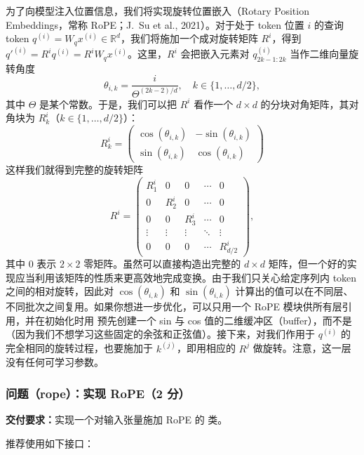 为了向模型注入位置信息，我们将实现旋转位置嵌入（Rotary Position Embeddings，常称 RoPE；J.~Su et al., 2021）。对于处于 token 位置 $i$ 的查询 token $q^{(i)} = W_q x^{(i)} \in \mathbb{R}^d$，我们将施加一个成对旋转矩阵 $R^i$，得到 $q'^{(i)} = R^i q^{(i)} = R^i W_q x^{(i)}$。这里，$R^i$ 会把嵌入元素对 $q^{(i)}_{2k-1:2k}$ 当作二维向量旋转角度
\[
\theta_{i,k} = \frac{i}{\Theta^{(2k-2)/d}}, \quad k \in \{1, \ldots, d/2\},
\]
其中 $\Theta$ 是某个常数。于是，我们可以把 $R^i$ 看作一个 $d \times d$ 的分块对角矩阵，其对角块为 $R^i_k$（$k \in \{1, \ldots, d/2\}$）：
\begin{equation}
R^i_k =
\begin{pmatrix}
\cos(\theta_{i,k}) & -\sin(\theta_{i,k}) \\
\sin(\theta_{i,k}) & \cos(\theta_{i,k})
\end{pmatrix}
\tag{8}
\end{equation}
这样我们就得到完整的旋转矩阵
\begin{equation}
R^i =
\begin{pmatrix}
R^i_1 & 0 & 0 & \cdots & 0 \\
0 & R^i_2 & 0 & \cdots & 0 \\
0 & 0 & R^i_3 & \cdots & 0 \\
\vdots & \vdots & \vdots & \ddots & \vdots \\
0 & 0 & 0 & \cdots & R^i_{d/2}
\end{pmatrix},
\tag{9}
\end{equation}
其中 0 表示 $2 \times 2$ 零矩阵。虽然可以直接构造出完整的 $d \times d$ 矩阵，但一个好的实现应当利用该矩阵的性质来更高效地完成变换。由于我们只关心给定序列内 token 之间的相对旋转，因此对 $\cos(\theta_{i,k})$ 和 $\sin(\theta_{i,k})$ 计算出的值可以在不同层、不同批次之间复用。如果你想进一步优化，可以只用一个 RoPE 模块供所有层引用，并在初始化时用  预先创建一个 sin 与 cos 值的二维缓冲区（buffer），而不是 （因为我们不想学习这些固定的余弦和正弦值）。接下来，对我们作用于 $q^{(i)}$ 的完全相同的旋转过程，也要施加于 $k^{(j)}$，即用相应的 $R^j$ 做旋转。注意，这一层没有任何可学习参数。

\subsubsection*{问题（rope）：实现 RoPE（2 分）}

\textbf{交付要求：}实现一个对输入张量施加 RoPE 的  类。

推荐使用如下接口：

